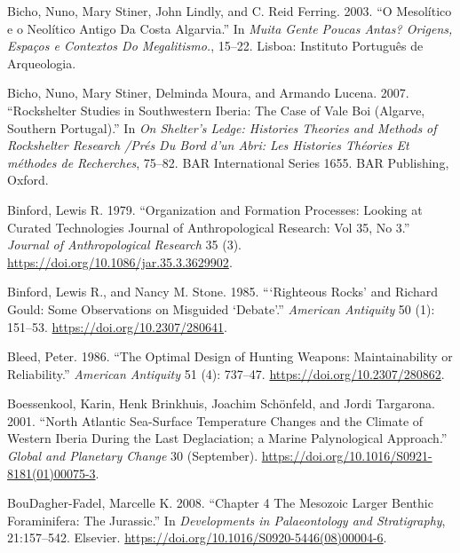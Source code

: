 \documentclass[
  a4paper,
  DIV=11,
  numbers=noendperiod]{scrreprt}
\newlength{\cslhangindent}
\newenvironment{CSLReferences}[2] %
 {\begin{list}{}{%
  \setlength{\itemindent}{0pt}
  \setlength{\leftmargin}{0pt}
  \setlength{\parsep}{0pt}
  \ifodd #1
   \setlength{\leftmargin}{\cslhangindent}
   \setlength{\itemindent}{-1\cslhangindent}
  \fi
  \setlength{\itemsep}{#2\baselineskip}}}
 {\end{list}}
\begin{document}
\begin{CSLReferences}{1}{0}
Bicho, Nuno, Mary Stiner, John Lindly, and C. Reid Ferring. 2003. {``O
{Mesol{í}tico} e o {Neol{í}tico} Antigo Da Costa Algarvia.''} In
\emph{Muita Gente Poucas Antas? {Origens}, Espa{ç}os e Contextos Do
{Megalitismo}.}, 15--22. Lisboa: Instituto Portugu{ê}s de Arqueologia.

Bicho, Nuno, Mary Stiner, Delminda Moura, and Armando Lucena. 2007.
{``Rockshelter Studies in Southwestern {Iberia}: The Case of Vale Boi
({Algarve}, Southern Portugal).''} In \emph{On {Shelter}'s {Ledge}:
{Histories Theories} and {Methods} of {Rockshelter Research} /{Pr{é}s}
Du Bord d'un Abri: {Les} Histories Th{é}ories Et m{é}thodes de
Recherches}, 75--82. {BAR International Series} 1655. BAR Publishing,
Oxford.

Binford, Lewis R. 1979. {``Organization and {Formation Processes}:
{Looking} at {Curated Technologies} {\textbar} {Journal} of
{Anthropological Research}: {Vol} 35, {No} 3.''} \emph{Journal of
Anthropological Research} 35 (3).
\url{https://doi.org/10.1086/jar.35.3.3629902}.

Binford, Lewis R., and Nancy M. Stone. 1985. {``{`{Righteous Rocks}'}
and {Richard Gould}: {Some Observations} on {Misguided} {`{Debate}'}.''}
\emph{American Antiquity} 50 (1): 151--53.
\url{https://doi.org/10.2307/280641}.

Bleed, Peter. 1986. {``The {Optimal Design} of {Hunting Weapons}:
{Maintainability} or {Reliability}.''} \emph{American Antiquity} 51 (4):
737--47. \url{https://doi.org/10.2307/280862}.

Boessenkool, Karin, Henk Brinkhuis, Joachim Schönfeld, and Jordi
Targarona. 2001. {``North Atlantic Sea-Surface Temperature Changes and
the Climate of Western Iberia During the Last Deglaciation; a Marine
Palynological Approach.''} \emph{Global and Planetary Change} 30
(September). \url{https://doi.org/10.1016/S0921-8181(01)00075-3}.

BouDagher-Fadel, Marcelle K. 2008. {``Chapter 4 {The Mesozoic} Larger
Benthic Foraminifera: The {Jurassic}.''} In \emph{Developments in
{Palaeontology} and {Stratigraphy}}, 21:157--542. Elsevier.
\url{https://doi.org/10.1016/S0920-5446(08)00004-6}.


\end{CSLReferences}
\end{document}
